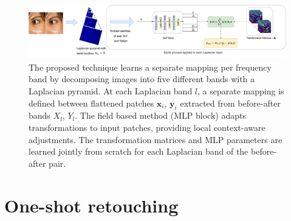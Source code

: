 \begin{landscape}\centering
\vspace*{\fill}
\begin{figure}[htpb]
  \centering
  \includegraphics[width=1.5\textwidth]{Chapters/detail-retouching-figs/MainFig.pdf}
  \caption{The proposed technique learns a separate mapping per frequency band by decomposing images into five different bands with a Laplacian pyramid. At each Laplacian band $l$, a separate mapping is defined between flattened patches $\mathbf{x}_i$, $\mathbf{y}_i$ extracted from before-after bands $X_l$, $Y_l$. The field based method (MLP block) adapts transformations to input patches, providing local context-aware adjustments. The transformation matrices and MLP parameters are learned jointly from scratch for each Laplacian band of the before-after pair.}
\end{figure}
\vfill
\end{landscape}




\section{One-shot retouching}
\label{sec:Methodology}

